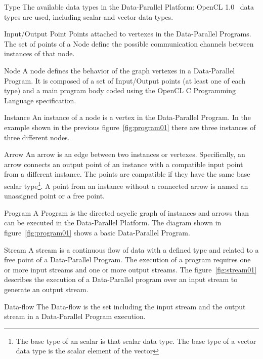 \documentclass[conference]{IEEEtran}
\begin{document}
\begin{LaTeXdescription}
\item[Type] The available data types in the Data-Parallel Platform: OpenCL
  1.0~\cite{opencl1.0} data types are used, including scalar and vector data
  types.

\item[Input/Output Point] Points attached to vertexes in the Data-Parallel
  Programs. The set of points of a Node define the possible communication
  channels between instances of that node.

\item[Node] A node defines the behavior of the graph vertexes in a Data-Parallel
  Program. It is composed of a set of Input/Output points (at least one of each
  type) and a main program body coded using the OpenCL C Programming Language
  specification.

\item[Instance] An instance of a node is a vertex in the Data-Parallel
  Program. In the example shown in the previous figure~\ref{fig:program01} 
  there are three instances of three different nodes.

\item[Arrow] An arrow is an edge between two instances or
  vertexes. Specifically, an arrow connects an output point of an instance with
  a compatible input point from a different instance. The points are compatible
  if they have the same base scalar type\footnote{The base type of an scalar is
    that scalar data type. The base type of a vector data type is the scalar
    element of the vector}. A point from an instance without a connected arrow
  is named an unassigned point or a free point.

\item[Program] A Program is the directed acyclic graph of instances and arrows
  than can be executed in the Data-Parallel Platform. The diagram shown in
  figure~\ref{fig:program01} shows a basic Data-Parallel Program.

\item[Stream] A stream is a continuous flow of data with a defined type and
  related to a free point of a Data-Parallel Program. The execution of a program
  requires one or more input streams and one or more output streams. The
  figure~\ref{fig:stream01} describes the execution of a Data-Parallel program
  over an input stream to generate an output stream.

\item[Data-flow] The Data-flow is the set including the input stream and the
  output stream in a Data-Parallel Program execution.

\end{LaTeXdescription}
\end{document}
